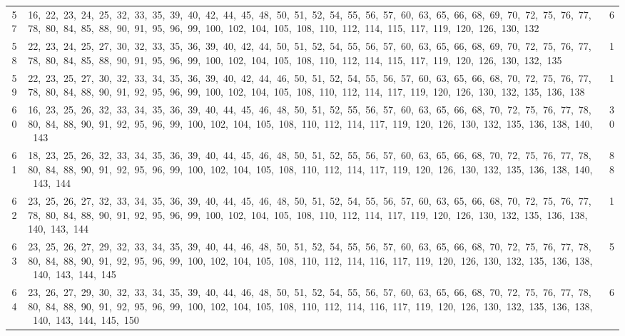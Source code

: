 \begin{longtable}{c|p{}|r}
57 & 16,\ 22,\ 23,\ 24,\ 25,\ 32,\ 33,\ 35,\ 39,\ 40,\ 42,\ 44,\ 45,\ 48,\ 50,\ 51,\ 52,\ 54,\ 55,\ 56,\ 57,\ 60,\ 63,\ 65,\ 66,\ 68,\ 69,\ 70,\ 72,\ 75,\ 76,\ 77,\ 78,\ 80,\ 84,\ 85,\ 88,\ 90,\ 91,\ 95,\ 96,\ 99,\ 100,\ 102,\ 104,\ 105,\ 108,\ 110,\ 112,\ 114,\ 115,\ 117,\ 119,\ 120,\ 126,\ 130,\ 132 & 6 \\
58 & 22,\ 23,\ 24,\ 25,\ 27,\ 30,\ 32,\ 33,\ 35,\ 36,\ 39,\ 40,\ 42,\ 44,\ 50,\ 51,\ 52,\ 54,\ 55,\ 56,\ 57,\ 60,\ 63,\ 65,\ 66,\ 68,\ 69,\ 70,\ 72,\ 75,\ 76,\ 77,\ 78,\ 80,\ 84,\ 85,\ 88,\ 90,\ 91,\ 95,\ 96,\ 99,\ 100,\ 102,\ 104,\ 105,\ 108,\ 110,\ 112,\ 114,\ 115,\ 117,\ 119,\ 120,\ 126,\ 130,\ 132,\ 135 & 1 \\
59 & 22,\ 23,\ 25,\ 27,\ 30,\ 32,\ 33,\ 34,\ 35,\ 36,\ 39,\ 40,\ 42,\ 44,\ 46,\ 50,\ 51,\ 52,\ 54,\ 55,\ 56,\ 57,\ 60,\ 63,\ 65,\ 66,\ 68,\ 70,\ 72,\ 75,\ 76,\ 77,\ 78,\ 80,\ 84,\ 88,\ 90,\ 91,\ 92,\ 95,\ 96,\ 99,\ 100,\ 102,\ 104,\ 105,\ 108,\ 110,\ 112,\ 114,\ 117,\ 119,\ 120,\ 126,\ 130,\ 132,\ 135,\ 136,\ 138 & 1 \\
60 & 16,\ 23,\ 25,\ 26,\ 32,\ 33,\ 34,\ 35,\ 36,\ 39,\ 40,\ 44,\ 45,\ 46,\ 48,\ 50,\ 51,\ 52,\ 55,\ 56,\ 57,\ 60,\ 63,\ 65,\ 66,\ 68,\ 70,\ 72,\ 75,\ 76,\ 77,\ 78,\ 80,\ 84,\ 88,\ 90,\ 91,\ 92,\ 95,\ 96,\ 99,\ 100,\ 102,\ 104,\ 105,\ 108,\ 110,\ 112,\ 114,\ 117,\ 119,\ 120,\ 126,\ 130,\ 132,\ 135,\ 136,\ 138,\ 140,\ 143 & 30 \\
61 & 18,\ 23,\ 25,\ 26,\ 32,\ 33,\ 34,\ 35,\ 36,\ 39,\ 40,\ 44,\ 45,\ 46,\ 48,\ 50,\ 51,\ 52,\ 55,\ 56,\ 57,\ 60,\ 63,\ 65,\ 66,\ 68,\ 70,\ 72,\ 75,\ 76,\ 77,\ 78,\ 80,\ 84,\ 88,\ 90,\ 91,\ 92,\ 95,\ 96,\ 99,\ 100,\ 102,\ 104,\ 105,\ 108,\ 110,\ 112,\ 114,\ 117,\ 119,\ 120,\ 126,\ 130,\ 132,\ 135,\ 136,\ 138,\ 140,\ 143,\ 144 & 88 \\
62 & 23,\ 25,\ 26,\ 27,\ 32,\ 33,\ 34,\ 35,\ 36,\ 39,\ 40,\ 44,\ 45,\ 46,\ 48,\ 50,\ 51,\ 52,\ 54,\ 55,\ 56,\ 57,\ 60,\ 63,\ 65,\ 66,\ 68,\ 70,\ 72,\ 75,\ 76,\ 77,\ 78,\ 80,\ 84,\ 88,\ 90,\ 91,\ 92,\ 95,\ 96,\ 99,\ 100,\ 102,\ 104,\ 105,\ 108,\ 110,\ 112,\ 114,\ 117,\ 119,\ 120,\ 126,\ 130,\ 132,\ 135,\ 136,\ 138,\ 140,\ 143,\ 144 & 1 \\
63 & 23,\ 25,\ 26,\ 27,\ 29,\ 32,\ 33,\ 34,\ 35,\ 39,\ 40,\ 44,\ 46,\ 48,\ 50,\ 51,\ 52,\ 54,\ 55,\ 56,\ 57,\ 60,\ 63,\ 65,\ 66,\ 68,\ 70,\ 72,\ 75,\ 76,\ 77,\ 78,\ 80,\ 84,\ 88,\ 90,\ 91,\ 92,\ 95,\ 96,\ 99,\ 100,\ 102,\ 104,\ 105,\ 108,\ 110,\ 112,\ 114,\ 116,\ 117,\ 119,\ 120,\ 126,\ 130,\ 132,\ 135,\ 136,\ 138,\ 140,\ 143,\ 144,\ 145 & 5 \\
64 & 23,\ 26,\ 27,\ 29,\ 30,\ 32,\ 33,\ 34,\ 35,\ 39,\ 40,\ 44,\ 46,\ 48,\ 50,\ 51,\ 52,\ 54,\ 55,\ 56,\ 57,\ 60,\ 63,\ 65,\ 66,\ 68,\ 70,\ 72,\ 75,\ 76,\ 77,\ 78,\ 80,\ 84,\ 88,\ 90,\ 91,\ 92,\ 95,\ 96,\ 99,\ 100,\ 102,\ 104,\ 105,\ 108,\ 110,\ 112,\ 114,\ 116,\ 117,\ 119,\ 120,\ 126,\ 130,\ 132,\ 135,\ 136,\ 138,\ 140,\ 143,\ 144,\ 145,\ 150 & 6 \\

\end{longtable}
